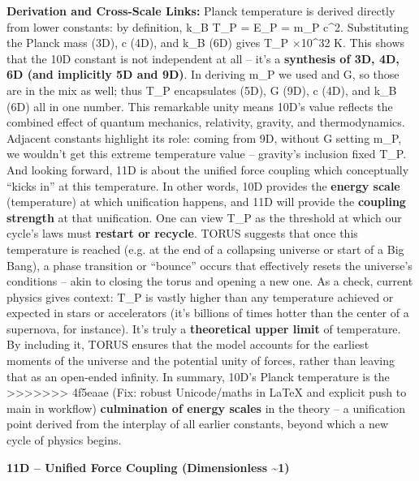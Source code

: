 \documentclass[]{article}
\begin{document}
\textbf{Derivation and Cross-Scale Links:} Planck temperature is derived
directly from lower constants: by definition, k\_B T\_P = E\_P = m\_P
c\^{}2​. Substituting the Planck mass (3D), c (4D), and k\_B (6D) gives
T\_P ×10\^{}32 K​. This shows that the 10D constant is not
independent at all -- it's a \textbf{synthesis of 3D, 4D, 6D (and
implicitly 5D and 9D)}​. In deriving m\_P we used \hbar and G, so those are
in the mix as well; thus T\_P encapsulates \hbar (5D), G (9D), c (4D), and
k\_B (6D) all in one number​. This remarkable unity means 10D's value
reflects the combined effect of quantum mechanics, relativity, gravity,
and thermodynamics. Adjacent constants highlight its role: coming from
9D, without G setting m\_P, we wouldn't get this extreme temperature
value -- gravity's inclusion fixed T\_P. And looking forward, 11D is
about the unified force coupling which conceptually ``kicks in'' at this
temperature. In other words, 10D provides the \textbf{energy scale}
(temperature) at which unification happens, and 11D will provide the
\textbf{coupling strength} at that unification​. One can view T\_P as
the threshold at which our cycle's laws must \textbf{restart or
recycle}. TORUS suggests that once this temperature is reached (e.g. at
the end of a collapsing universe or start of a Big Bang), a phase
transition or ``bounce'' occurs that effectively resets the universe's
conditions -- akin to closing the torus and opening a new one​. As a
check, current physics gives context: T\_P is vastly higher than any
temperature achieved or expected in stars or accelerators (it's billions
of times hotter than the center of a supernova, for instance). It's
truly a \textbf{theoretical upper limit} of temperature. By including
it, TORUS ensures that the model accounts for the earliest moments of
the universe and the potential unity of forces, rather than leaving that
as an open-ended infinity. In summary, 10D's Planck temperature is the
>>>>>>> 4f5eaae (Fix: robust Unicode/maths in LaTeX and explicit push to main in workflow)
\textbf{culmination of energy scales} in the theory -- a unification
point derived from the interplay of all earlier constants, beyond which
a new cycle of physics begins.

\textbf{11D -- Unified Force Coupling (Dimensionless
\textasciitilde{}1)}
\end{document}
